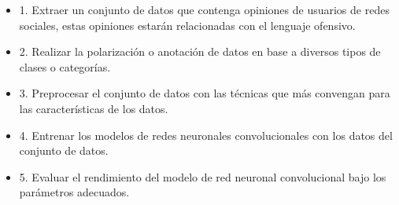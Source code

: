 \begin{itemize}
	\item	1. Extraer un conjunto de datos que contenga opiniones de usuarios de redes sociales, estas opiniones estarán relacionadas con el lenguaje ofensivo.
	\item 2. Realizar la polarización o anotación de datos en base a diversos tipos de clases o categorías.
	\item 3. Preprocesar el conjunto de datos con las técnicas que más convengan para las características de los datos.
	\item 4. Entrenar los modelos de redes neuronales convolucionales con los datos del conjunto de datos.
	\item 5. Evaluar el rendimiento del modelo de red neuronal convolucional bajo los parámetros adecuados.
\end{itemize}